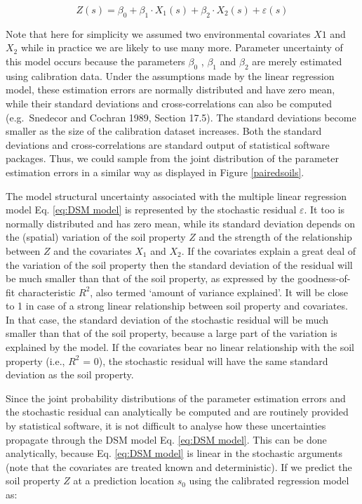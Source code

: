 \documentclass[10pt,b5paper,]{book}
\theoremstyle{definition}
\theoremstyle{definition}
\theoremstyle{definition}
\theoremstyle{remark}
\begin{document}
\begin{equation}
\label{eq:DSM model}
Z(s) = \beta_0 + \beta_1  \cdot X_1 (s) + \beta_2 \cdot X_2 (s) + \varepsilon(s)
\end{equation}

Note that here for simplicity we assumed two environmental covariates
\({X1}\) and \({X_2}\) while in practice we are likely to use many more.
Parameter uncertainty of this model occurs because the parameters
\({\beta_0}\) , \({\beta_1}\) and \({\beta_2}\) are merely estimated
using calibration data. Under the assumptions made by the linear
regression model, these estimation errors are normally distributed and
have zero mean, while their standard deviations and cross-correlations
can also be computed (e.g.~Snedecor and Cochran 1989, Section 17.5). The
standard deviations become smaller as the size of the calibration
dataset increases. Both the standard deviations and cross-correlations
are standard output of statistical software packages. Thus, we could
sample from the joint distribution of the parameter estimation errors in
a similar way as displayed in Figure \ref{pairedsoils}.

The model structural uncertainty associated with the multiple linear
regression model Eq. \ref{eq:DSM model} is represented by the stochastic
residual \({\varepsilon}\). It too is normally distributed and has zero
mean, while its standard deviation depends on the (spatial) variation of
the soil property \(Z\) and the strength of the relationship between
\(Z\) and the covariates \({X_1}\) and \({X_2}\). If the covariates
explain a great deal of the variation of the soil property then the
standard deviation of the residual will be much smaller than that of the
soil property, as expressed by the goodness-of-fit characteristic
\({R^2}\), also termed `amount of variance explained'. It will be close
to 1 in case of a strong linear relationship between soil property and
covariates. In that case, the standard deviation of the stochastic
residual will be much smaller than that of the soil property, because a
large part of the variation is explained by the model. If the covariates
bear no linear relationship with the soil property (i.e., \({R^2}\) =
0), the stochastic residual will have the same standard deviation as the
soil property.

Since the joint probability distributions of the parameter estimation
errors and the stochastic residual can analytically be computed and are
routinely provided by statistical software, it is not difficult to
analyse how these uncertainties propagate through the DSM model Eq.
\ref{eq:DSM model}. This can be done analytically, because Eq.
\ref{eq:DSM model} is linear in the stochastic arguments (note that the
covariates are treated known and deterministic). If we predict the soil
property \(Z\) at a prediction location \({s_0}\) using the calibrated
regression model as:
\end{document}
